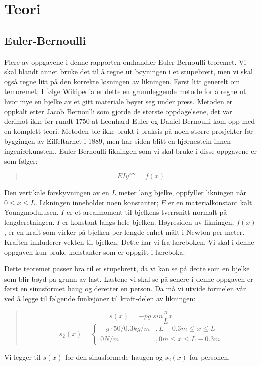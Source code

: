 \section{Teori}

\subsection{Euler-Bernoulli}
Flere av oppgavene i denne rapporten omhandler Euler-Bernoulli-teoremet. Vi skal blandt annet bruke det til å regne ut bøyningen i et stupebrett, men vi skal også regne litt på den korrekte løsningen av likningen. Først litt generelt om temoremet; I følge Wikipedia er dette en grunnleggende metode for å regne ut hvor mye en bjelke av et gitt materiale bøyer seg under press. Metoden er oppkalt etter Jacob Bernoulli som gjorde de største oppdagelsene, det var derimot ikke før rundt 1750 at Leonhard Euler og Daniel Bernoulli kom opp med en komplett teori. Metoden ble ikke brukt i praksis på noen større prosjekter før byggingen av Eiffeltårnet i 1889, men har siden blitt en hjørnestein innen ingeniørkunsten.\cite{eulerweb}. Euler-Bernoulli-likningen som vi skal bruke i disse oppgavene er som følger:
\begin{quote}
\begin{equation}
EIy''''=f(x)
\end{equation}
\end{quote}

Den vertikale forskyvningen av en $L$ meter lang bjelke, oppfyller likningen når $0\leq x\leq L$. Likningen inneholder noen konstanter; $E$ er en materialkonstant kalt Youngmodulusen. $I$ er et arealmoment til bjelkens tverrsnitt normalt på lengderetningen. $I$ er konstant langs hele bjelken. Høyresiden av likningen, $f(x)$, er en kraft som virker på bjelken per lengde-enhet målt i Newton per meter. Kraften inkluderer vekten til bjelken. Dette har vi fra læreboken. Vi skal i denne oppgaven kun bruke konstanter som er oppgitt i læreboka.\cite[s.~102]{fagbok}

Dette teoremet passer bra til et stupebrett, da vi kan se på dette som en bjelke som blir bøyd på grunn av last. Lastene vi skal se på senere i denne oppgaven er først en sinusformet haug og deretter en person. Da må vi utvide formelen vår ved å legge til følgende funksjoner til kraft-delen av likningen:
\begin{quote}
\begin{equation}
s(x)=-pg\;sin\frac{\pi}{L}x
\end{equation}
\begin{equation}
s_2(x)=\begin{cases}
	-g\cdot{50/0.3kg/m} & ,L-0.3m\leq x\leq L\\
	0N/m & ,0m\leq x\leq L-0.3m
	\end{cases}
\end{equation}
\end{quote}
Vi legger til $s(x)$ for den sinusformede haugen og $s_2(x)$ for personen. 

